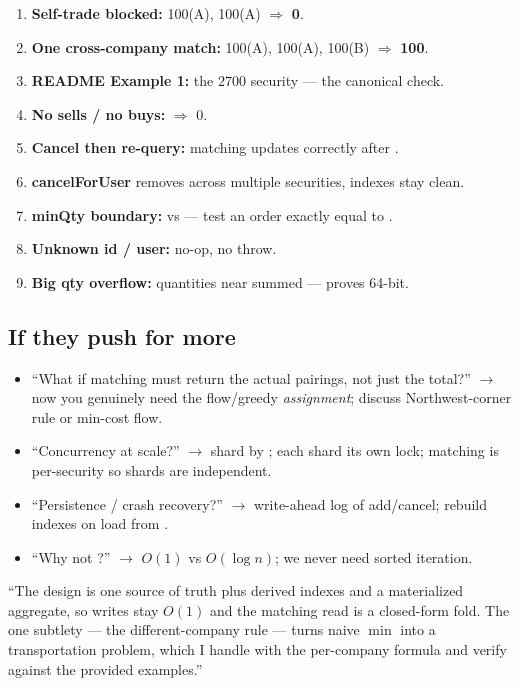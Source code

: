 \begin{enumerate}[leftmargin=1.6em]
  \item \textbf{Self-trade blocked:} \Buy{}100(A), \Sell{}100(A) $\Rightarrow$ \textbf{0}.
  \item \textbf{One cross-company match:} \Buy{}100(A), \Sell{}100(A), \Sell{}100(B) $\Rightarrow$ \textbf{100}.
  \item \textbf{README Example 1:} the $2700$ security --- the canonical check.
  \item \textbf{No sells / no buys:} $\Rightarrow$ 0.
  \item \textbf{Cancel then re-query:} matching updates correctly after .
  \item \textbf{cancelForUser} removes across multiple securities, indexes stay clean.
  \item \textbf{minQty boundary:} \code{>=} vs \code{>} --- test an order exactly equal to .
  \item \textbf{Unknown id / user:} no-op, no throw.
  \item \textbf{Big qty overflow:} quantities near  summed --- proves 64-bit.
\end{enumerate}

\subsection{If they push for more}

\begin{itemize}[leftmargin=1.6em,label=\textcolor{Accent}{\faArrowRight}]
  \item ``What if matching must return the actual pairings, not just the total?''
        $\to$ now you genuinely need the flow/greedy \emph{assignment}; discuss
        Northwest-corner rule or min-cost flow.
  \item ``Concurrency at scale?'' $\to$ shard by ; each shard its
        own lock; matching is per-security so shards are independent.
  \item ``Persistence / crash recovery?'' $\to$ write-ahead log of add/cancel;
        rebuild indexes on load from .
  \item ``Why  not ?'' $\to$ $O(1)$ vs $O(\log n)$;
        we never need sorted iteration.
\end{itemize}

\begin{say}
``The design is one source of truth plus derived indexes and a materialized
aggregate, so writes stay $O(1)$ and the matching read is a closed-form fold. The
one subtlety --- the different-company rule --- turns naive $\min$ into a
transportation problem, which I handle with the per-company formula and verify
against the provided examples.''
\end{say}
